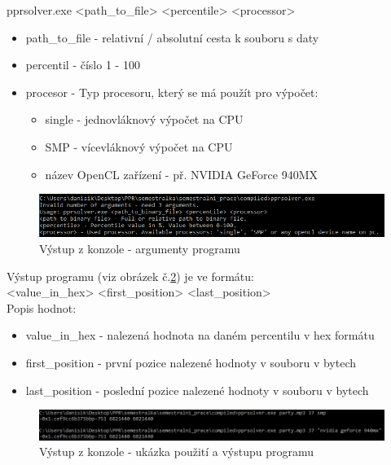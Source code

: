 \documentclass[12pt, a4paper]{article}
\begin{document}
\noindent pprsolver.exe <path\_to\_file> <percentile> <processor>

\begin{itemize}
\item path\_to\_file - relativní / absolutní cesta k souboru s daty
\item percentil - číslo 1 - 100
\item procesor - Typ procesoru, který se má použít pro výpočet:
\begin{itemize}
\item single - jednovláknový výpočet na CPU
\item SMP - vícevláknový výpočet na CPU
\item název OpenCL zařízení - př. NVIDIA GeForce 940MX
\end{itemize}
\end{itemize}

\begin{figure}[h!]
\centering
\includegraphics[width=16cm]{img/console_invalid}
\caption{Výstup z konzole - argumenty programu}
\label{fig:arguments}
\end{figure}

\noindent Výstup programu (viz obrázek č.\ref{fig:output}) je ve formátu:\\

\noindent <value\_in\_hex> <first\_position> <last\_position>\\

\noindent Popis hodnot:
\begin{itemize}
\item value\_in\_hex - nalezená hodnota na daném percentilu v hex formátu
\item first\_position - první pozice nalezené hodnoty v souboru v bytech
\item last\_position - poslední pozice nalezené hodnoty v souboru v bytech
\end{itemize}

\begin{figure}[h!]
\centering
\includegraphics[width=16cm]{img/console_output}
\caption{Výstup z konzole - ukázka použití a výstupu programu}
\label{fig:output}
\end{figure}
\end{document}
